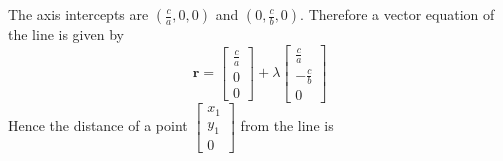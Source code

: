 \documentclass[11pt, a4paper]{article}
\begin{document}
The axis intercepts are $\left(\frac{c}{a},0,0\right)$ and $\left(0,\frac{c}{b},0\right)$. Therefore a vector equation of the line is given by
\begin{equation*}
\boldsymbol{r}=\begin{bmatrix} \frac{c}{a} \\ 0 \\ 0 \end{bmatrix}+\lambda\begin{bmatrix} \frac{c}{a} \\ -\frac{c}{b} \\ 0 \end{bmatrix}
\end{equation*}
Hence the distance of a point $\begin{bmatrix}x_{1} \\ y_{1} \\ 0 \end{bmatrix}$ from the line is
\small
\end{document}
